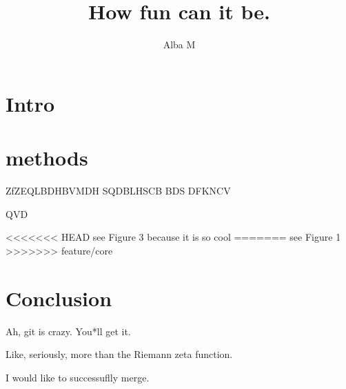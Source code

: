 \documentclass{article}
\author{Alba M}
\title{How fun can it be.}
\begin{document}
	\maketitle
	\section{Intro}
	\section{methods}
	ZfZEQLBDHBVMDH
	SQDBLHSCB
	BDS
	DFKNCV
	
	QVD
	
<<<<<<< HEAD
	see Figure 3 because it is so cool
=======
	see Figure 1
>>>>>>> feature/core
	
	\section{Conclusion}
	Ah, git is crazy. You*ll get it.
	
	Like, seriously, more than the Riemann zeta function.
	
	I would like to successuflly merge.
	
\end{document}
